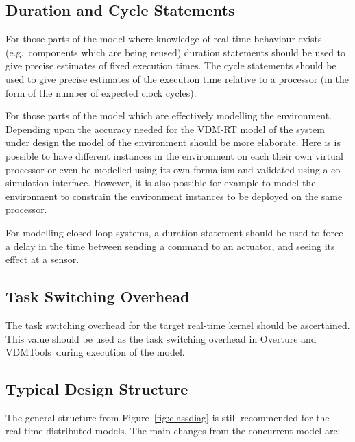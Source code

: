 \documentclass{overturerepchap}
\newcommand{\vdmtools}{VDMTools}
\begin{document}
\subsection{Duration and Cycle Statements}

For those parts of the model where knowledge of real-time behaviour
exists (e.g.\ components which are being reused) duration statements
should be used to give precise estimates of fixed execution times. The 
cycle statements should be used to give precise estimates of the 
execution time relative to a processor (in the form of the number of 
expected clock cycles).

For those parts of the model which are effectively modelling the
environment. Depending upon the accuracy needed for the VDM-RT model of
the system under design the model of the environment should be more
elaborate. Here is is possible to have different instances in the
environment on each their own virtual processor or even be modelled
using its own formalism and validated using a co-simulation
interface. 
However, it is also
possible for example to model the environment to constrain the
environment instances to be deployed on the same processor.

For modelling closed loop systems, a duration statement should be used
to force a delay in the time between sending a command to an actuator,
and seeing its effect at a sensor.

\subsection{Task Switching Overhead}

The task switching overhead for the target real-time kernel should be
ascertained. This value should be used as the task switching overhead
in Overture and \vdmtools\ during execution of the model.

\subsection{Typical Design Structure}\label{sec:designvice}

The general structure from Figure~\ref{fig:classdiag} is still recommended 
for the real-time distributed models. The main changes from the concurrent
model are:
\end{document}
